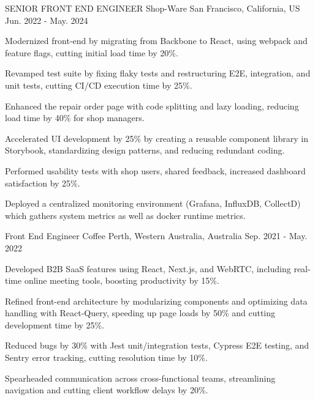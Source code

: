

\begin{cventries}

  \cventry
  {SENIOR FRONT END ENGINEER} %
  {Shop-Ware} %
  {San Francisco, California, US} %
  {Jun. 2022 - May. 2024} %
  {
    \begin{cvitems} %
      \item {Modernized front-end by migrating from Backbone to React, using webpack and feature flags, cutting initial load time by 20\%.}
      \item {Revamped test suite by fixing flaky tests and restructuring E2E, integration, and unit tests, cutting CI/CD execution time by 25\%.}
      \item {Enhanced the repair order page with code splitting and lazy loading, reducing load time by 40\% for shop managers.}
      \item {Accelerated UI development by 25\% by creating a reusable component library in Storybook, standardizing design patterns, and reducing redundant coding.}
      \item {Performed usability tests with shop users, shared feedback, increased dashboard satisfaction by 25\%.}
      \item {Deployed a centralized monitoring environment (Grafana, InfluxDB, CollectD) which gathers system metrics as well as docker runtime metrics.}
    \end{cvitems}
  }

  \cventry
  {Front End Engineer} %
  {Coffee} %
  {Perth, Western Australia, Australia} %
  {Sep. 2021 - May. 2022} %
  {
    \begin{cvitems} %
      \item {Developed B2B SaaS features using React, Next.js, and WebRTC, including real-time online meeting tools, boosting productivity by 15\%.}
      \item {Refined front-end architecture by modularizing components and optimizing data handling with React-Query, speeding up page loads by 50\% and cutting development time by 25\%.}
      \item {Reduced bugs by 30\% with Jest unit/integration tests, Cypress E2E testing, and Sentry error tracking, cutting resolution time by 10\%.}
      \item {Spearheaded communication across cross-functional teams, streamlining navigation and cutting client workflow delays by 20\%.}
    \end{cvitems}
  }


\end{cventries}

